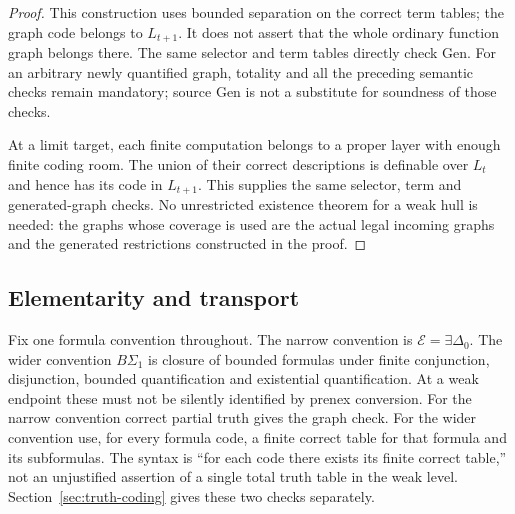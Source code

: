 \begin{proof}
This construction uses bounded separation on the correct term tables;
the graph code belongs to $L_{t+1}$. It does not assert that the whole
ordinary function graph belongs there. The same selector and term
tables directly check Gen. For an arbitrary newly quantified graph,
totality and all the preceding semantic checks remain mandatory;
source Gen is not a substitute for soundness of those checks.

At a limit target, each finite computation belongs to a proper layer
with enough finite coding room. The union of their correct descriptions
is definable over $L_t$ and hence has its code in $L_{t+1}$. This supplies
the same selector, term and generated-graph checks. No unrestricted
existence theorem for a weak hull is needed: the graphs whose coverage
is used are the actual legal incoming graphs and the generated
restrictions constructed in the proof.
\end{proof}

\subsection{Elementarity and transport}
Fix one formula convention throughout. The narrow convention is
$\mathcal E=\exists\Delta_0$. The wider convention $B\Sigma_1$ is
closure of bounded formulas under finite conjunction, disjunction,
bounded quantification and existential quantification. At a weak
endpoint these must not be silently identified by prenex conversion.
For the narrow convention correct partial truth gives the graph
check. For the wider convention use, for every formula code, a finite
correct table for that formula and its subformulas. The syntax is
``for each code there exists its finite correct table,'' not an
unjustified assertion of a single total truth table in the weak level.
Section~\ref{sec:truth-coding} gives these two checks separately.

